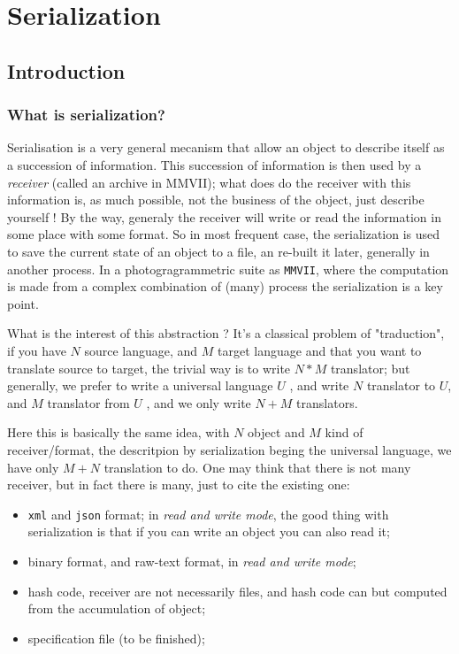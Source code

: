 \chapter{Serialization}



\section{Introduction}

\subsection{What is serialization?}

Serialisation is a very general mecanism that allow an object to describe
itself as a succession of information.   This succession of information is
then used by a \emph{receiver} (called an archive in MMVII); what does
do the receiver with this information is, as much possible, not the business
of the object, just describe yourself !  By the way, generaly the receiver will write or read the information
in some place with some format. So in most frequent case, the serialization is used
to save the current state of an object to a file, an re-built it later, generally in
another process.  In a photogragrammetric suite as {\tt MMVII},  where the computation
is made from a complex combination of (many) process the serialization is a key point.

What is the interest of this abstraction ? It's a classical problem of "traduction",
if you have $N$  source language, and $M$ target language and that you want to translate
source to target, the trivial way is to write $N*M$ translator; but generally, we prefer
to write a universal language $U$ , and write $N$ translator to $U$, and $M$ translator 
from $U$ , and we only write $N+M$ translators.

Here this is basically the same idea, with $N$ object and $M$ kind of receiver/format,
the descritpion by serialization beging the universal language, we have only $M+N$
translation to do.  One may think that there is not many receiver, but in fact there is many,
just to cite the existing one:

\begin{itemize}
	\item  {\tt xml} and {\tt  json}  format; in \emph{read and write mode},  the good thing
		with serialization is that if you can write an object you can also read it;

	\item  binary format, and raw-text format,  in \emph{read and write mode};

	\item  hash code, receiver are not necessarily files, and hash code can but computed
		from the accumulation of object;

	\item  specification file (to be finished);
\end{itemize}

